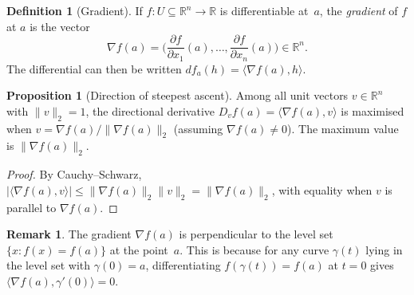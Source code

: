 \documentclass[12pt,a4paper]{book}
\theoremstyle{definition}
\newtheorem{definition}{Definition}[chapter]
\newtheorem{proposition}{Proposition}[chapter]
\newtheorem{remark}{Remark}[chapter]
\begin{document}
\begin{definition}[Gradient]\label{def:gradient}
If $f\colon U\subseteq\mathbb{R}^n\to\mathbb{R}$ is differentiable at~$a$,
the \emph{gradient} of $f$ at $a$ is the vector
\[
  \nabla f(a) = \biggl(\frac{\partial f}{\partial x_1}(a),\dots,
  \frac{\partial f}{\partial x_n}(a)\biggr) \in\mathbb{R}^n.
\]
The differential can then be written $df_a(h)=\langle\nabla f(a),h\rangle$.
\end{definition}

\begin{proposition}[Direction of steepest ascent]
\label{prop:steepest-ascent}
Among all unit vectors $v\in\mathbb{R}^n$ with $\|v\|_2=1$, the directional
derivative $D_v f(a)=\langle\nabla f(a),v\rangle$ is maximised when
$v=\nabla f(a)/\|\nabla f(a)\|_2$ (assuming $\nabla f(a)\ne 0$).  The
maximum value is $\|\nabla f(a)\|_2$.
\end{proposition}

\begin{proof}
By Cauchy--Schwarz, $|\langle\nabla f(a),v\rangle|\le\|\nabla f(a)\|_2\|v\|_2
=\|\nabla f(a)\|_2$, with equality when $v$ is parallel to $\nabla f(a)$.
\end{proof}

\begin{remark}
The gradient $\nabla f(a)$ is perpendicular to the level set
$\{x:f(x)=f(a)\}$ at the point~$a$.  This is because for any curve
$\gamma(t)$ lying in the level set with $\gamma(0)=a$, differentiating
$f(\gamma(t))=f(a)$ at $t=0$ gives $\langle\nabla f(a),\gamma'(0)\rangle=0$.
\end{remark}

\begin{center}
\label{fig:gradient-contour}
\end{center}
\end{document}
